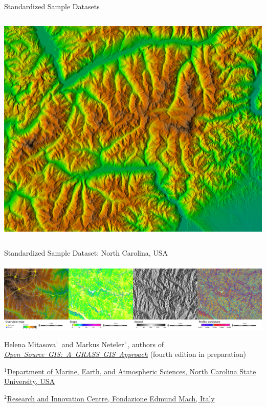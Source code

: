 \documentclass[xcolor={dvipsnames,usenames},beamer]{beamer}
\newcommand{\n}[1]{$^{\textcolor{gray}{\mbox{\tiny{#1}}}}$}
\begin{document}
\begin{frame}[fragile]{Standardized Sample Datasets}
\begin{columns}[c]
 \includegraphics[width=\textwidth]{./images/dataset/std_dataset_piemonte_shaded_elevation}%
\end{columns}


\end{frame}



\begin{frame}{Standardized Sample Dataset: North Carolina, USA}

\begin{center}
\includegraphics[width=\textwidth]{./images/dataset/std_dataset_nc_stripe.png}
\end{center}


Helena Mitasova\n{1} and Markus Neteler\n{2}, authors of
\mbox{\href{http://grassbook.org/}{\it Open Source GIS: A GRASS GIS Approach}}
{\scriptsize (fourth edition in preparation)}

\bigskip

{\scriptsize
$^1$\href{http://www.meas.ncsu.edu/}%
{Department of Marine, Earth, and Atmospheric Sciences,
North Carolina State University, USA}

$^2$\href{http://gis.cri.fmach.it/}%
{Research and Innovation Centre, Fondazione Edmund Mach, Italy}
}

\end{frame}
\end{document}
